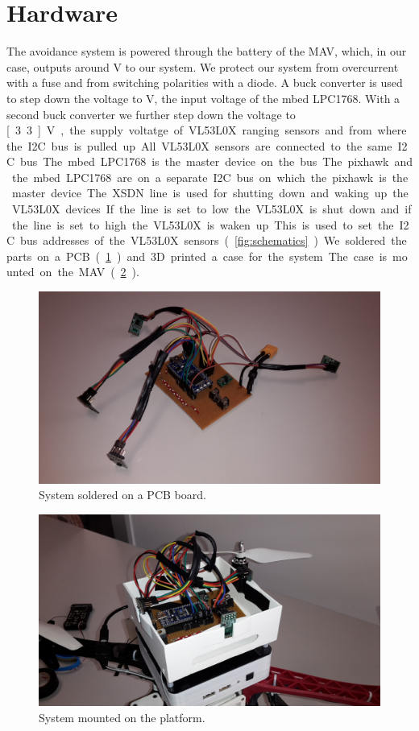 \section{Hardware}
The avoidance system is powered through the battery of the MAV, which, in our case, outputs around \unit[12]{V} to our system. We protect our system from overcurrent with a fuse and from switching polarities with a diode. A buck converter is used to step down the voltage to \unit[5]{V}, the input voltage of the mbed LPC1768. With a second buck converter we further step down the voltage to \unit[3.3]{V}, the supply voltatge of VL53L0X ranging sensors and from where the I2C bus is pulled up. All VL53L0X sensors are connected to the same I2C bus. The mbed LPC1768 is the master device on the bus. The pixhawk and the mbed LPC1768 are on a separate I2C bus on which the pixhawk is the master device. The XSDN line is used for shutting down and waking up the VL53L0X devices. If the line is set to low the VL53L0X is shut down and if the line is set to high the VL53L0X is waken up. This is used to set the I2C bus addresses of the VL53L0X sensors (\cref{fig:schematics}). We soldered the parts on a PCB (\cref{fig:pcb}) and 3D printed a case for the system. The case is mounted on the MAV (\cref{fig:system}). 
\begin{figure}
	\centering
	\includegraphics[width=\linewidth]{pictures/pcb.jpg}
	\caption{System soldered on a PCB board.}
	\label{fig:pcb}
\end{figure} 
\begin{figure}
	\centering
	\includegraphics[width=\linewidth]{pictures/system.jpg}
	\caption{System mounted on the platform.}
	\label{fig:system}
\end{figure}
